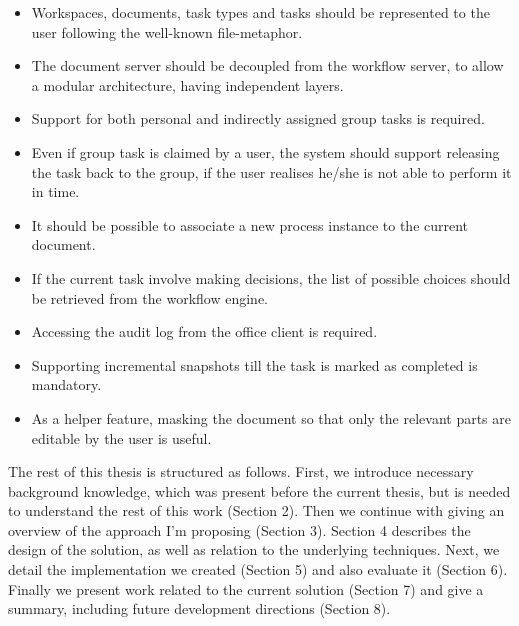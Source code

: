 \begin{itemize}
\item Workspaces, documents, task types and tasks should be represented to the
user following the well-known file-metaphor.
\item The document server should be decoupled from the workflow server, to
allow a modular architecture, having independent layers.
\item Support for both personal and indirectly assigned group tasks is required.
\item Even if group task is claimed by a user, the system should support
releasing the task back to the group, if the user realises he/she is not able to
perform it in time.
\item It should be possible to associate a new process instance to the current
document.
\item If the current task involve making decisions, the list of possible
choices should be retrieved from the workflow engine.
\item Accessing the audit log from the office client is required.
\item Supporting incremental snapshots till the task is marked as completed is
mandatory.
\item As a helper feature, masking the document so that only the relevant parts
are editable by the user is useful.
\end{itemize}

The rest of this thesis is structured as follows. First, we introduce necessary
background knowledge, which was present before the current thesis, but is
needed to understand the rest of this work (Section 2). Then we continue with
giving an overview of the approach I'm proposing (Section 3). Section 4
describes the design of the solution, as well as relation to the underlying
techniques. Next, we detail the implementation we created (Section 5) and also
evaluate it (Section 6). Finally we present work related to the current
solution (Section 7) and give a summary, including future development
directions (Section 8).
